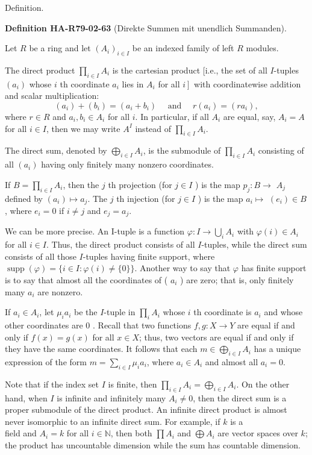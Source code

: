 \documentclass[10pt, letterpaper]{article}
\newcommand{\CustomHeading}[3]{%
  \par\medskip\noindent%
  \textbf{#1 #2} \textnormal{(#3)}.\enskip%
}
\newenvironment{DEF}[2]{\begin{unitbox}\CustomHeading{Definition}{#1}{#2}}{\end{unitbox}}
\begin{document}
Definition. 

\begin{DEF}{HA-R79-02-63}{Direkte Summen mit unendlich Summanden}
Let $R$ be a ring and let $\left(A_{i}\right)_{i \in I}$ be an indexed family of left $R$ modules. 

The direct product $\prod_{i \in I} A_{i}$ is the cartesian product [i.e., the set of all $I$-tuples $\left(a_{i}\right)$ whose $i$ th coordinate $a_{i}$ lies in $A_{i}$ for all $\left.i\right]$ with coordinatewise addition and scalar multiplication:
$$
\left(a_{i}\right)+\left(b_{i}\right)=\left(a_{i}+b_{i}\right) \quad \text { and } \quad r\left(a_{i}\right)=\left(r a_{i}\right),
$$
where $r \in R$ and $a_{i}, b_{i} \in A_{i}$ for all $i$. In particular, if all $A_{i}$ are equal, say, $A_{i}=A$ for all $i \in I$, then we may write $A^{I}$ instead of $\prod_{i \in I} A_{i}$.


The direct sum, denoted by $\bigoplus_{i \in I} A_{i}$, is the submodule of $\prod_{i \in I} A_{i}$ consisting of all $\left(a_{i}\right)$ having only finitely many nonzero coordinates.

If $B=\prod_{i \in I} A_{i}$, then the $j$ th projection (for $j \in I$ ) is the map $p_{j}: B \rightarrow$ $A_{j}$ defined by $\left(a_{i}\right) \mapsto a_{j}$. The $j$ th injection (for $j \in I$ ) is the map $a_{i} \mapsto$ $\left(e_{i}\right) \in B$, where $e_{i}=0$ if $i \neq j$ and $e_{j}=a_{j}$.

We can be more precise. An I-tuple is a function $\varphi: I \rightarrow \bigcup_{i} A_{i}$ with $\varphi(i) \in A_{i}$ for all $i \in I$. Thus, the direct product consists of all $I$-tuples, while the direct sum consists of all those $I$-tuples having finite support, where $\operatorname{supp}(\varphi)=\{i \in I: \varphi(i) \neq\{0\}\}$. Another way to say that $\varphi$ has finite support is to say that almost all the coordinates of ( $a_{i}$ ) are zero; that is, only finitely many $a_{i}$ are nonzero.

If $a_{i} \in A_{i}$, let $\mu_{i} a_{i}$ be the $I$-tuple in $\prod_{i} A_{i}$ whose $i$ th coordinate is $a_{i}$ and whose other coordinates are 0 . Recall that two functions $f, g: X \rightarrow Y$ are equal if and only if $f(x)=g(x)$ for all $x \in X$; thus, two vectors are equal if and only if they have the same coordinates. It follows that each $m \in \bigoplus_{i \in I} A_{i}$ has a unique expression of the form $m=\sum_{i \in I} \mu_{i} a_{i}$, where $a_{i} \in A_{i}$ and almost all $a_{i}=0$.

Note that if the index set $I$ is finite, then $\prod_{i \in I} A_{i}=\bigoplus_{i \in I} A_{i}$. On the other hand, when $I$ is infinite and infinitely many $A_{i} \neq 0$, then the direct sum is a proper submodule of the direct product. An infinite direct product is almost never isomorphic to an infinite direct sum. For example, if $k$ is a\\
field and $A_{i}=k$ for all $i \in \mathbb{N}$, then both $\prod A_{i}$ and $\bigoplus A_{i}$ are vector spaces over $k$; the product has uncountable dimension while the sum has countable dimension.
\end{DEF}
\end{document}
